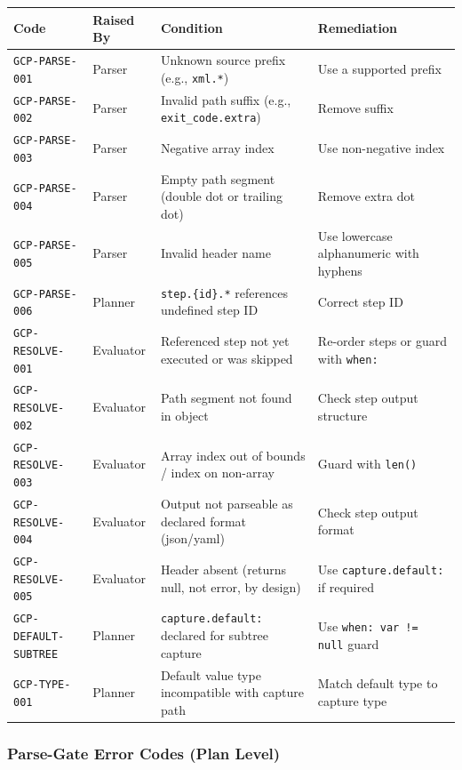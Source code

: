 \begin{center}\small
\begin{tabular}{p{3.5cm}p{1.8cm}p{5.5cm}p{3.5cm}}
\hline
\textbf{Code} & \textbf{Raised By} & \textbf{Condition} & \textbf{Remediation} \\
\hline
\texttt{GCP-PARSE-001}      & Parser   & Unknown source prefix (e.g., \texttt{xml.*}) & Use a supported prefix \\
\texttt{GCP-PARSE-002}      & Parser   & Invalid path suffix (e.g., \texttt{exit\_code.extra}) & Remove suffix \\
\texttt{GCP-PARSE-003}      & Parser   & Negative array index & Use non-negative index \\
\texttt{GCP-PARSE-004}      & Parser   & Empty path segment (double dot or trailing dot) & Remove extra dot \\
\texttt{GCP-PARSE-005}      & Parser   & Invalid header name & Use lowercase alphanumeric with hyphens \\
\texttt{GCP-PARSE-006}      & Planner  & \texttt{step.\{id\}.*} references undefined step ID & Correct step ID \\
\texttt{GCP-RESOLVE-001}    & Evaluator & Referenced step not yet executed or was skipped & Re-order steps or guard with \texttt{when:} \\
\texttt{GCP-RESOLVE-002}    & Evaluator & Path segment not found in object & Check step output structure \\
\texttt{GCP-RESOLVE-003}    & Evaluator & Array index out of bounds / index on non-array & Guard with \texttt{len()} \\
\texttt{GCP-RESOLVE-004}    & Evaluator & Output not parseable as declared format (json/yaml) & Check step output format \\
\texttt{GCP-RESOLVE-005}    & Evaluator & Header absent (returns null, not error, by design) & Use \texttt{capture.default:} if required \\
\texttt{GCP-DEFAULT-SUBTREE}& Planner  & \texttt{capture.default:} declared for subtree capture & Use \texttt{when: var != null} guard \\
\texttt{GCP-TYPE-001}       & Planner  & Default value type incompatible with capture path & Match default type to capture type \\
\hline
\end{tabular}
\end{center}

\subsubsection{Parse-Gate Error Codes (Plan Level)}
\label{sec:parse-gate:error-codes:plan}

